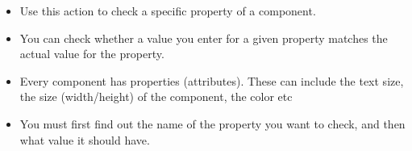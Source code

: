 \begin{itemize}
\item Use this action to check a specific property of a component. 
\item You can check whether a value you enter for a given property matches the actual value for the property.
\item Every component has properties (attributes). These can include the text size, the size (width/height) of the component, the color etc
\item You must first find out the name of the property you want to check, and then what value it should have. 
\end{itemize}

